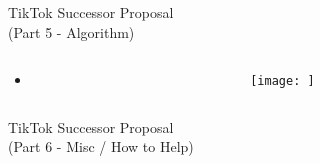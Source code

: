 \documentclass[aspectratio=169]{beamer}
\begin{document}
\begin{frame}
    \centering
    \Huge TikTok Successor Proposal \\
    \Huge (Part 5 - Algorithm)
\end{frame}

\begin{frame}{}
\begin{columns}[T]
    \begin{column}[T]{0.5\textwidth}
        \begin{itemize}
            \item 
        \end{itemize}
    \end{column}
    \begin{column}{0.5\textwidth}
        \texttt{[image: ]}
    \end{column}
\end{columns}
\end{frame}

\begin{frame}
    \centering
    \Huge TikTok Successor Proposal \\
    \Huge (Part 6 - Misc / How to Help)
\end{frame}
\end{document}
